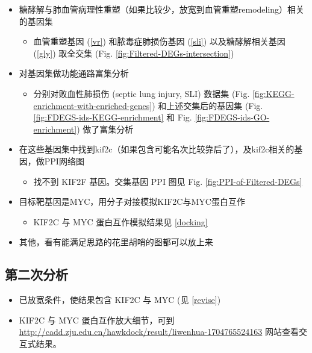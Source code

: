 \documentclass[
]{article}
\providecommand{\tightlist}{%
  \setlength{\itemsep}{0pt}\setlength{\parskip}{0pt}}
\begin{document}
\begin{itemize}
\tightlist
\item
  糖酵解与肺血管病理性重塑（如果比较少，放宽到血管重塑remodeling）相关的基因集

  \begin{itemize}
  \tightlist
  \item
    血管重塑基因 (\ref{vr}) 和脓毒症肺损伤基因 (\ref{sli}) 以及糖酵解相关基因 (\ref{gly}) 取全交集 (Fig. \ref{fig:Filtered-DEGs-intersection})
  \end{itemize}
\item
  对基因集做功能通路富集分析

  \begin{itemize}
  \tightlist
  \item
    分别对败血性肺损伤 (septic lung injury, SLI) 数据集 (Fig. \ref{fig:KEGG-enrichment-with-enriched-genes}) 和上述交集后的基因集 (Fig. \ref{fig:FDEGS-ids-KEGG-enrichment} 和 Fig. \ref{fig:FDEGS-ids-GO-enrichment}) 做了富集分析
  \end{itemize}
\item
  在这些基因集中找到kif2c（如果包含可能名次比较靠后了），及kif2c相关的基因，做PPI网络图

  \begin{itemize}
  \tightlist
  \item
    找不到 KIF2F 基因。交集基因 PPI 图见 Fig. \ref{fig:PPI-of-Filtered-DEGs}
  \end{itemize}
\item
  目标靶基因是MYC，用分子对接模拟KIF2C与MYC蛋白互作

  \begin{itemize}
  \tightlist
  \item
    KIF2C 与 MYC 蛋白互作模拟结果见 \ref{docking}
  \end{itemize}
\item
  其他，看有能满足思路的花里胡哨的图都可以放上来
\end{itemize}

\hypertarget{ux7b2cux4e8cux6b21ux5206ux6790}{%
\subsection{第二次分析}\label{ux7b2cux4e8cux6b21ux5206ux6790}}

\begin{itemize}
\tightlist
\item
  已放宽条件，使结果包含 KIF2C 与 MYC (见 \ref{revise})
\item
  KIF2C 与 MYC 蛋白互作放大细节，可到 \url{http://cadd.zju.edu.cn/hawkdock/result/liwenhua-1704765524163} 网站查看交互式结果。
\end{itemize}
\end{document}
